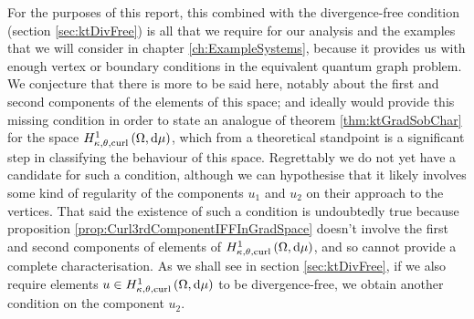 For the purposes of this report, this combined with the divergence-free condition (section \ref{sec:ktDivFree}) is all that we require for our analysis and the examples that we will consider in chapter \ref{ch:ExampleSystems}, because it provides us with enough vertex or boundary conditions in the equivalent quantum graph problem.
We conjecture that there is more to be said here, notably about the first and second components of the elements of this space; and ideally would provide this missing condition in order to state an analogue of theorem \ref{thm:ktGradSobChar} for the space $H^1_{\kappa,\theta,\mathrm{curl}}\left( \Omega, \mathrm{d}\mu \right)$, which from a theoretical standpoint is a significant step in classifying the behaviour of this space.
Regrettably we do not yet have a candidate for such a condition, although we can hypothesise that it likely involves some kind of regularity of the components $u_1$ and $u_2$ on their approach to the vertices.
That said the existence of such a condition is undoubtedly true because proposition \ref{prop:Curl3rdComponentIFFInGradSpace} doesn't involve the first and second components of elements of $H^1_{\kappa,\theta,\mathrm{curl}}\left( \Omega, \mathrm{d}\mu \right)$, and so cannot provide a complete characterisation.
As we shall see in section \ref{sec:ktDivFree}, if we also require elements $u\in H^1_{\kappa,\theta,\mathrm{curl}}\left( \Omega, \mathrm{d}\mu \right)$ to be divergence-free, we obtain another condition on the component $u_2$.

